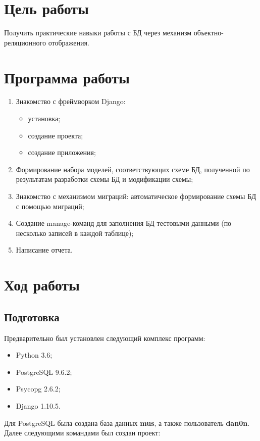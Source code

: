 \section{Цель работы}
Получить практические навыки работы с БД через механизм объектно-реляционного отображения.

\section{Программа работы}
\begin{enumerate}
	\item Знакомство с фреймворком Django:
	\begin{itemize}
		\item установка;
		\item создание проекта;
		\item создание приложения;
	\end{itemize}
	\item  Формирование набора моделей, соответствующих схеме БД, полученной по результатам разработки схемы БД и модификации схемы;
	\item Знакомство с механизмом миграций: автоматическое формирование схемы БД с помощью миграций;
	\item Создание manage-команд для заполнения БД тестовыми данными (по несколько записей в каждой таблице);
	\item Написание отчета.
\end{enumerate}

\section{Ход работы}
\subsection{Подготовка}
Предварительно был установлен следующий комплекс программ:

\begin{itemize}
\item Python 3.6;
\item PostgreSQL 9.6.2;
\item Psycopg 2.6.2;
\item Django 1.10.5.
\end{itemize}

Для PostgreSQL была создана база данных \textbf{mus}, а также пользователь \textbf{dan0n}.
Далее следующими командами был создан проект:

